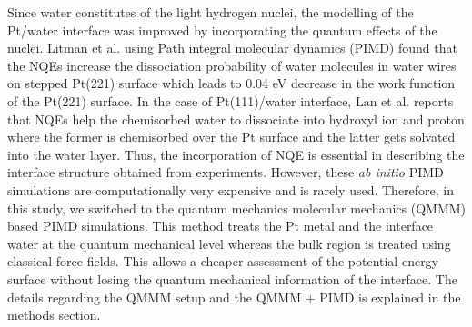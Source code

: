 Since water constitutes of the light hydrogen nuclei, the modelling of the Pt/water interface was improved by incorporating the quantum effects of the nuclei. Litman et al.\cite{litman2018decisive} using Path integral molecular dynamics (PIMD) found that the NQEs increase the dissociation probability of water molecules in water wires on stepped Pt(221) surface which leads to 0.04 eV decrease in the work function of the Pt(221) surface. In the case of Pt(111)/water interface, Lan et al.\cite{lan2020ionization} reports that NQEs help the chemisorbed water to dissociate into hydroxyl ion and proton where the former is chemisorbed over the Pt surface and the latter gets solvated into the water layer. Thus, the incorporation of NQE is essential in describing the interface structure obtained from experiments\cite{tian2022visualizing,magnussen2019toward}. However, these \textit{ab initio} PIMD simulations are computationally very expensive and is rarely used. Therefore, in this study, we switched to the quantum mechanics molecular mechanics (QMMM) based PIMD simulations. This method treats the Pt metal and the interface water at the quantum mechanical level whereas the bulk region is treated using classical force fields. This allows a cheaper assessment of the potential energy surface without losing the quantum mechanical information of the interface. The details regarding the QMMM setup and the QMMM $+$ PIMD is explained in the methods section. 

